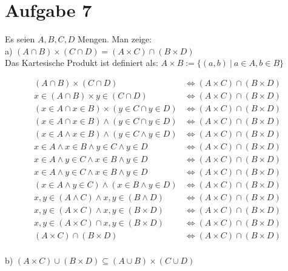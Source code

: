 \section*{Aufgabe 7}

Es seien $A, B, C, D$ Mengen. Man zeige:\\

a) $(A \cap B) \times (C \cap D) = (A \times C) \cap (B \times D)$\\

Das Kartesische Produkt ist definiert als: $A \times B := \{(a,b) \ | \ a \in A, b \in B\}$

\begin{align*}
(A \cap B) \times (C \cap D) &\Leftrightarrow (A \times C) \cap (B \times D)\\
x \in (A \cap B) \times y \in (C \cap D) &\Leftrightarrow (A \times C) \cap (B \times D)\\
(x \in A \cap x \in B) \times (y \in C \cap y \in D) &\Leftrightarrow (A \times C) \cap (B \times D)\\
(x \in A \cap x \in B) \land (y \in C \cap y \in D) &\Leftrightarrow (A \times C) \cap (B \times D)\\
(x \in A \land x \in B) \land (y \in C \land y \in D) &\Leftrightarrow (A \times C) \cap (B \times D)\\
x \in A \land x \in B \land y \in C \land y \in D &\Leftrightarrow (A \times C) \cap (B \times D)\\
x \in A \land y \in C \land x \in B \land y \in D &\Leftrightarrow (A \times C) \cap (B \times D)\\
x \in A \land y \in C \land x \in B \land y \in D &\Leftrightarrow (A \times C) \cap (B \times D)\\
(x \in A \land y \in C) \land (x \in B \land y \in D) &\Leftrightarrow (A \times C) \cap (B \times D)\\
x,y \in (A \land C) \land x,y \in (B \land D) &\Leftrightarrow (A \times C) \cap (B \times D)\\
x,y \in (A \times C) \land x,y \in (B \times D) &\Leftrightarrow (A \times C) \cap (B \times D)\\
x,y \in (A \times C) \cap x,y \in (B \times D) &\Leftrightarrow (A \times C) \cap (B \times D)\\
(A \times C) \cap (B \times D) &\Leftrightarrow (A \times C) \cap (B \times D)\\
\end{align*}

b) $(A \times C) \cup (B \times D) \subseteq (A \cup B) \times (C \cup D)$\\

